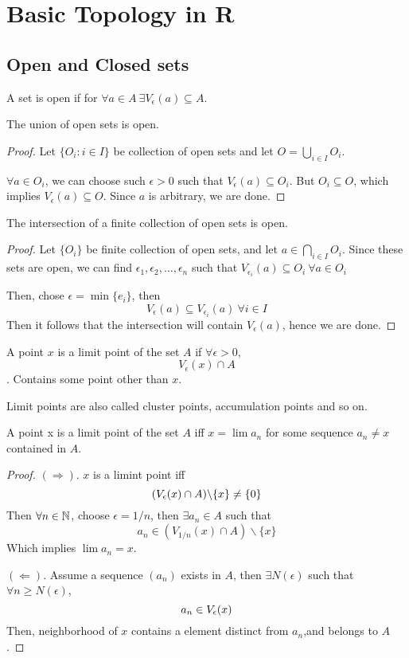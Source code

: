 \chapter{Basic Topology in R}
\section{Open and Closed sets}

\begin{definition} A set is open if for $\forall a \in A \ \exists V_{\epsilon}(a) \subseteq A$.
\end{definition}

\begin{theorem} The union of open sets is open.
    \begin{proof} Let $\{ O_i: i \in I\}$ be collection of open sets and let $O = \bigcup_{i \in I} O_i$.

        $\forall a \in O_i$, we can choose such $\epsilon > 0 $ such that $V_{\epsilon}(a) \subseteq O_i$. But $O_i \subseteq O$, which implies $V_{\epsilon}(a) \subseteq O$. Since $a$ is arbitrary, we are done.
    \end{proof}
\end{theorem}
\begin{theorem} The intersection of a finite collection of open sets is open.
    \begin{proof}
        Let $\{O_i\}$ be finite collection of open sets, and let $a \in \bigcap_{i \in I} O_i$. Since these sets are open, we can find $\epsilon_1, \epsilon_2, \ldots, \epsilon_n$ such that $V_{\epsilon_i}(a) \subseteq O_i \ \forall a \in O_i$

        Then, chose $\epsilon = \min \{ e_i\}$, then 
        \[ V_{\epsilon}(a) \subseteq V_{\epsilon_i}(a) \ \forall i \in I\]
        Then it follows that the intersection will contain $V_{\epsilon}(a)$, hence we are done.
    \end{proof}
\end{theorem}
\begin{definition} A point $x$ is a limit point of the set $A$ if $\forall \epsilon > 0$, 
    \[ V_{\epsilon}(x) \cap A \].
    Contains some point other than $x$.

    Limit points are also called cluster points, accumulation points and so on.
\end{definition}
\begin{theorem} A point x is a limit point of the set $A$ iff $x = \lim a_n$ for some sequence $a_n \neq x$ contained in $A$.
    \begin{proof}
    $(\Rightarrow)$. $x$ is a limint point iff
    \[ (V_{\epsilon}(x) \cap A) \backslash \{x\}  \neq \{ 0\}\]
    Then $\forall n \in {\mathbb{N}}$, choose $\epsilon = 1/n$, then $\exists a_n \in A$ such that
    \[ a_n \in (V_{1/n}(x) \cap A) \backslash \{x\}\]
    Which implies $\lim a_n = x$. 

    $(\Leftarrow)$. Assume a sequence $(a_n)$ exists in $A$, then $\exists N(\epsilon)$ such that $\forall n \ge N(\epsilon)$, 
    \[ a_n \in V_{\epsilon}(x)\]
    Then, neighborhood of $x$ contains a element distinct from $a_n$,and belongs to $A$.
    \end{proof}
\end{theorem}
